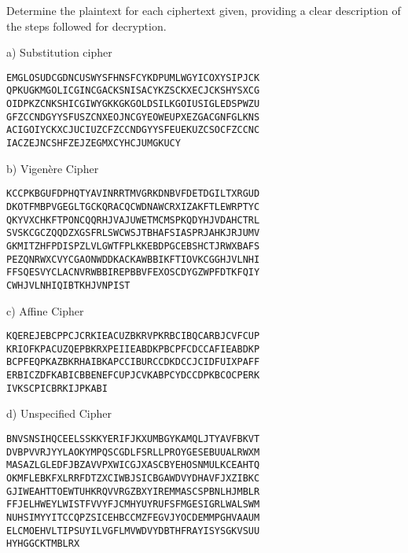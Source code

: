 \begin{statement}{1.21}
  Determine the plaintext for each ciphertext given, providing a clear description of
  the steps followed for decryption.

  a) Substitution cipher

\begin{verbatim}
EMGLOSUDCGDNCUSWYSFHNSFCYKDPUMLWGYICOXYSIPJCK
QPKUGKMGOLICGINCGACKSNISACYKZSCKXECJCKSHYSXCG
OIDPKZCNKSHICGIWYGKKGKGOLDSILKGOIUSIGLEDSPWZU
GFZCCNDGYYSFUSZCNXEOJNCGYEOWEUPXEZGACGNFGLKNS
ACIGOIYCKXCJUCIUZCFZCCNDGYYSFEUEKUZCSOCFZCCNC
IACZEJNCSHFZEJZEGMXCYHCJUMGKUCY
\end{verbatim}
    
  b) Vigen\`{e}re Cipher

\begin{verbatim}
KCCPKBGUFDPHQTYAVINRRTMVGRKDNBVFDETDGILTXRGUD
DKOTFMBPVGEGLTGCKQRACQCWDNAWCRXIZAKFTLEWRPTYC
QKYVXCHKFTPONCQQRHJVAJUWETMCMSPKQDYHJVDAHCTRL
SVSKCGCZQQDZXGSFRLSWCWSJTBHAFSIASPRJAHKJRJUMV
GKMITZHFPDISPZLVLGWTFPLKKEBDPGCEBSHCTJRWXBAFS
PEZQNRWXCVYCGAONWDDKACKAWBBIKFTIOVKCGGHJVLNHI
FFSQESVYCLACNVRWBBIREPBBVFEXOSCDYGZWPFDTKFQIY
CWHJVLNHIQIBTKHJVNPIST
\end{verbatim}

c) Affine Cipher

\begin{verbatim}
KQEREJEBCPPCJCRKIEACUZBKRVPKRBCIBQCARBJCVFCUP
KRIOFKPACUZQEPBKRXPEIIEABDKPBCPFCDCCAFIEABDKP
BCPFEQPKAZBKRHAIBKAPCCIBURCCDKDCCJCIDFUIXPAFF
ERBICZDFKABICBBENEFCUPJCVKABPCYDCCDPKBCOCPERK
IVKSCPICBRKIJPKABI
\end{verbatim}

d) Unspecified Cipher

\begin{verbatim}
BNVSNSIHQCEELSSKKYERIFJKXUMBGYKAMQLJTYAVFBKVT
DVBPVVRJYYLAOKYMPQSCGDLFSRLLPROYGESEBUUALRWXM
MASAZLGLEDFJBZAVVPXWICGJXASCBYEHOSNMULKCEAHTQ
OKMFLEBKFXLRRFDTZXCIWBJSICBGAWDVYDHAVFJXZIBKC
GJIWEAHTTOEWTUHKRQVVRGZBXYIREMMASCSPBNLHJMBLR
FFJELHWEYLWISTFVVYFJCMHYUYRUFSFMGESIGRLWALSWM
NUHSIMYYITCCQPZSICEHBCCMZFEGVJYOCDEMMPGHVAAUM
ELCMOEHVLTIPSUYILVGFLMVWDVYDBTHFRAYISYSGKVSUU
HYHGGCKTMBLRX
\end{verbatim}
\end{statement}
